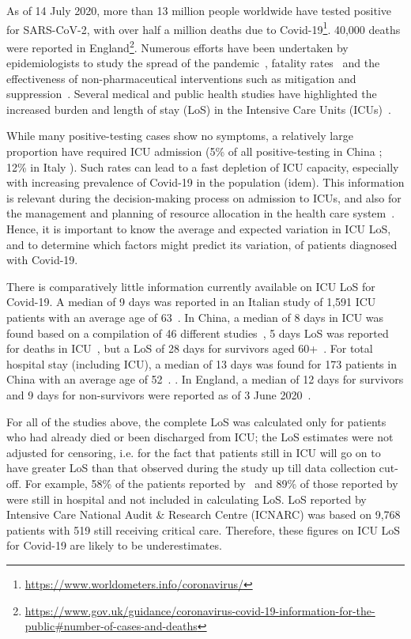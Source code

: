 \documentclass[review]{elsarticle}
\begin{document}
As of 14 July 2020, more than 13 million people worldwide have tested positive for SARS-CoV-2, with over half a million deaths due to Covid-19\footnote{\url{https://www.worldometers.info/coronavirus/}}. 40,000 deaths were reported in England\footnote{\url{https://www.gov.uk/guidance/coronavirus-covid-19-information-for-the-public\#number-of-cases-and-deaths}}. Numerous efforts have been undertaken by epidemiologists to study the spread of the pandemic~\cite{chinazzi2020effect,flaxman2020report}, fatality rates~\cite{dorigatti2020report} and the effectiveness of non-pharmaceutical interventions such as mitigation and suppression~\cite{ferguson2020report}. Several medical and public health studies have highlighted the increased burden and length of stay (LoS) in the Intensive Care Units (ICUs)~\cite{grasselli2020critical,zhou2020clinical,072020icnarc,xie2020critical}.

While many positive-testing cases show no symptoms, a relatively large proportion have required ICU admission (5\% of all positive-testing in China \cite{wu2020nervous}; 12\% in Italy \cite{grasselli2020critical}). Such rates can lead to a fast depletion of ICU capacity, especially with increasing prevalence of Covid-19 in the population (idem). This information is relevant during the decision-making process on admission to ICUs, and also for the management and planning of resource allocation in the health care system~\cite{Yang2020}. Hence, it is important to know the average and expected variation in ICU LoS, and to determine which factors might predict its variation, of patients diagnosed with Covid-19.

There is comparatively little information currently available on ICU LoS for Covid-19. A median of 9 days was reported in an Italian study of 1,591 ICU patients with an average age of 63~\cite{grasselli2020critical}. In China, a median of 8 days in ICU was found based on a compilation of 46 different studies~\cite{Rees2020.04.30.20084780},
5 days LoS was reported for deaths in ICU~\cite{thomas2020coronavirus, wang2020clinical}, but a LoS of 28 days for survivors aged 60+~\cite{wang2020clinical}. For total hospital stay (including ICU), a median of 13 days was found for 173 patients in China with an average age of 52~\cite{guan2020clinical}. \cite{wang2020clinical}. In England, a median of 12 days for survivors and 9 days for non-survivors were reported as of 3 June 2020~\cite{072020icnarc}. 

For all of the studies above, the complete LoS was calculated only for patients who had already died or been discharged from ICU; the LoS estimates were not adjusted for censoring, i.e. for the fact that patients still in ICU will go on to have greater LoS than that observed during the study up till data collection cut-off. For example, 58\% of the patients reported by~\cite{grasselli2020critical} and 89\% of those reported by~\cite{guan2020clinical} were still in hospital and not included in calculating LoS. LoS reported by Intensive Care National Audit \& Research Centre (ICNARC) was based on 9,768 patients with 519 still receiving critical care. Therefore, these figures on ICU LoS for Covid-19 are likely to be underestimates.
\end{document}
